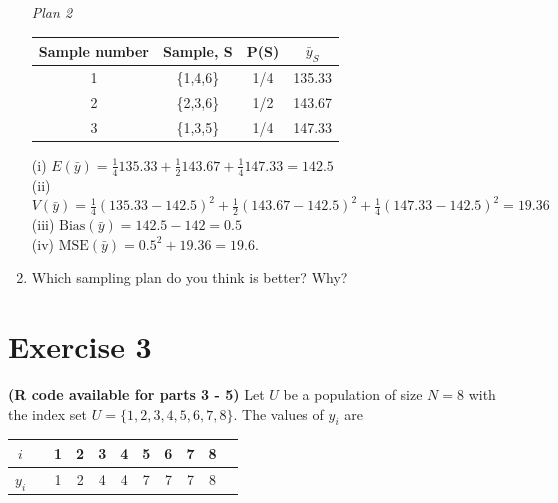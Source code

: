 \documentclass[12pt]{article}
\begin{document}
\begin{enumerate}
{\begin{minipage}[t]{0.97\linewidth}
\textit{Plan 2}\\
\begin{center}
\begin{tabular}{cccc}
Sample number & Sample, S & P(S) & $\bar{y}_S$\\
\hline
1 &\{1,4,6\}& 1/4&135.33\\
2 &\{2,3,6\}& 1/2&143.67\\
3 &\{1,3,5\}& 1/4&147.33\\
\end{tabular}
\end{center}
(i) $E(\bar{y})=\frac{1}{4}135.33+\frac{1}{2}143.67+\frac{1}{4}147.33=142.5$ \\
(ii) $V(\bar{y})=\frac{1}{4}(135.33-142.5)^2+\frac{1}{2}(143.67-142.5)^2+\frac{1}{4}(147.33-142.5)^2=19.36$ \\
(iii) $\mathrm{Bias}(\bar{y})=142.5-142=0.5$ \\
(iv) $\mathrm{MSE}(\bar{y})=0.5^2+19.36=19.6$. \\
\end{minipage}}
\item Which sampling plan do you think is better? Why?\\
\end{enumerate}

\section*{Exercise 3}
\textbf{\color{ForestGreen}(R code available for parts 3 - 5)} Let  $U$ be a population of size $N=8$ with the index set $U = \{1, 2, 3, 4, 5, 6, 7, 8\}$. The values of $y_i$ are 
\begin{center}
\begin{tabular}{ccccccccccc}
$i$ & \vline & 1 & 2 & 3 & 4 & 5 & 6 & 7 & 8 \\
\hline
$y_i$ & \vline &  1 & 2 & 4 & 4 & 7 & 7 & 7 & 8
\end{tabular}
\end{center}
\end{document}
